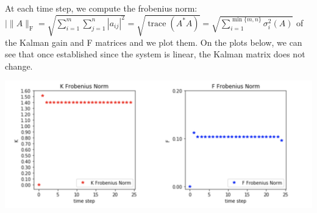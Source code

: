 \documentclass[12pt]{article}
\begin{document}
At each time step, we compute the frobenius norm: $|\|A\|_{\mathrm{F}}=\sqrt{\sum_{i=1}^{m} \sum_{j=1}^{n}\left|a_{i j}\right|^{2}}=\sqrt{\operatorname{trace}\left(A^{*} A\right)}=\sqrt{\sum_{i=1}^{\min \{m, n\}} \sigma_{i}^{2}(A)}$ 
of the Kalman gain and F matrices and we plot them. On the plots below, we can see that once established since the system is linear, the Kalman matrix does not change.
\begin{center}
	\includegraphics[width=1\linewidth]{figures/problem_4_3.png} 
\end{center}
\end{document}
